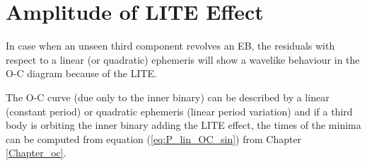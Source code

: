 \section{Amplitude of LITE Effect}
In case when an unseen third component revolves an EB, the residuals with respect to a linear (or quadratic) ephemeris will show
a wavelike behaviour in the O-C diagram because of the LITE.

The O-C curve (due only to the inner binary) can be described by a linear (constant period) or quadratic
ephemeris (linear period variation) and if a third body is orbiting the inner binary adding the LITE effect, the times
of the minima can be computed from equation (\ref{eq:P_lin_OC_sin}) from Chapter \ref{Chapter_oc}. 



